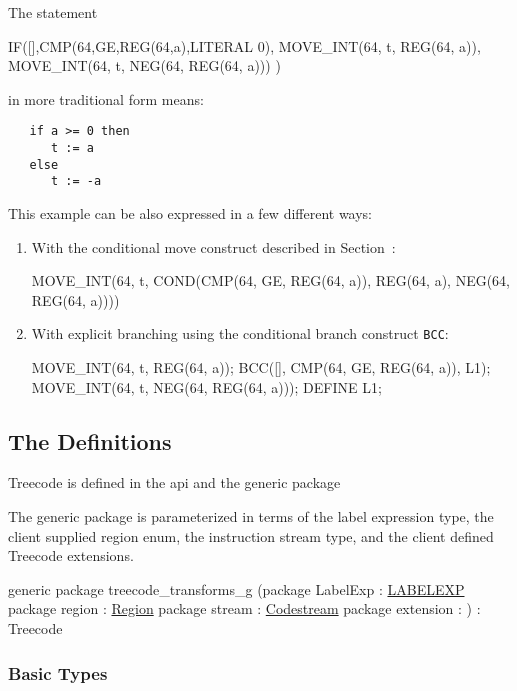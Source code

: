 The statement
\begin{SML}
   IF([],CMP(64,GE,REG(64,a),LITERAL 0),
         MOVE_INT(64, t, REG(64, a)),
         MOVE_INT(64, t, NEG(64, REG(64, a)))
     )
\end{SML}
in more traditional form means:
\begin{verbatim}
   if a >= 0 then 
      t := a
   else
      t := -a
\end{verbatim} 
This example can be also expressed in a few different ways: 
\begin{enumerate}
   \item With the conditional move construct described in 
Section~:
     \begin{SML}
    MOVE_INT(64, t, 
       COND(CMP(64, GE, REG(64, a)), 
            REG(64, a), 
            NEG(64, REG(64, a))))
     \end{SML}
  \item With explicit branching using the conditional branch
construct \verb|BCC|:
    \begin{SML}
     MOVE_INT(64, t, REG(64, a));
     BCC([], CMP(64, GE, REG(64, a)), L1);
     MOVE_INT(64, t, NEG(64, REG(64, a)));
     DEFINE L1;
    \end{SML}
\end{enumerate}
\subsection{The Definitions}

Treecode is defined in the api 
and the generic package 

The generic package  is parameterized in terms of
the label expression type, the client supplied region enum,
the instruction stream type, and the client defined Treecode extensions.
\begin{SML}
  generic package treecode_transforms_g
    (package LabelExp : \href{labelexp.html}{LABELEXP}
     package region : \href{regions.html}{Region}
     package stream : \href{streams.html}{Codestream}
     package extension : 
    ) : Treecode
\end{SML}

\subsubsection{Basic Types}

